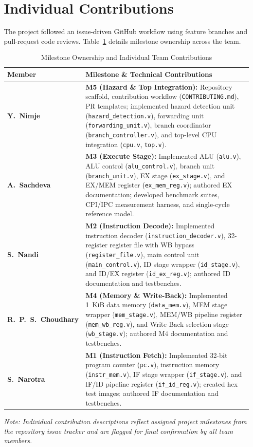 \documentclass[conference]{IEEEtran}
\begin{document}
\section{Individual Contributions}
The project followed an issue-driven GitHub workflow using feature branches and pull-request code reviews. Table~\ref{tab:contributions} details milestone ownership across the team.

\begin{table}[htbp]
\caption{Milestone Ownership and Individual Team Contributions}
\label{tab:contributions}
\centering
\footnotesize
\begin{tabularx}{\columnwidth}{@{}lX@{}}
\toprule
\textbf{Member} & \textbf{Milestone \& Technical Contributions} \\
\midrule
\textbf{Y.~Nimje} & \textbf{M5 (Hazard \& Top Integration):} Repository scaffold, contribution workflow (\texttt{CONTRIBUTING.md}), PR templates; implemented hazard detection unit (\texttt{hazard\_detection.v}), forwarding unit (\texttt{forwarding\_unit.v}), branch coordinator (\texttt{branch\_controller.v}), and top-level CPU integration (\texttt{cpu.v}, \texttt{top.v}). \\
\addlinespace
\textbf{A.~Sachdeva} & \textbf{M3 (Execute Stage):} Implemented ALU (\texttt{alu.v}), ALU control (\texttt{alu\_control.v}), branch unit (\texttt{branch\_unit.v}), EX stage (\texttt{ex\_stage.v}), and EX/MEM register (\texttt{ex\_mem\_reg.v}); authored EX documentation; developed benchmark suites, CPI/IPC measurement harness, and single-cycle reference model. \\
\addlinespace
\textbf{S.~Nandi} & \textbf{M2 (Instruction Decode):} Implemented instruction decoder (\texttt{instruction\_decoder.v}), 32-register register file with WB bypass (\texttt{register\_file.v}), main control unit (\texttt{main\_control.v}), ID stage wrapper (\texttt{id\_stage.v}), and ID/EX register (\texttt{id\_ex\_reg.v}); authored ID documentation and testbenches. \\
\addlinespace
\textbf{R.~P.~S.~Choudhary} & \textbf{M4 (Memory \& Write-Back):} Implemented 1~KiB data memory (\texttt{data\_mem.v}), MEM stage wrapper (\texttt{mem\_stage.v}), MEM/WB pipeline register (\texttt{mem\_wb\_reg.v}), and Write-Back selection stage (\texttt{wb\_stage.v}); authored M4 documentation and testbenches. \\
\addlinespace
\textbf{S.~Narotra} & \textbf{M1 (Instruction Fetch):} Implemented 32-bit program counter (\texttt{pc.v}), instruction memory (\texttt{instr\_mem.v}), IF stage wrapper (\texttt{if\_stage.v}), and IF/ID pipeline register (\texttt{if\_id\_reg.v}); created hex test images; authored IF documentation and testbenches. \\
\bottomrule
\end{tabularx}
\vspace{2pt}
\raggedright \scriptsize \textit{Note: Individual contribution descriptions reflect assigned project milestones from the repository issue tracker and are flagged for final confirmation by all team members.}
\end{table}
\end{document}
